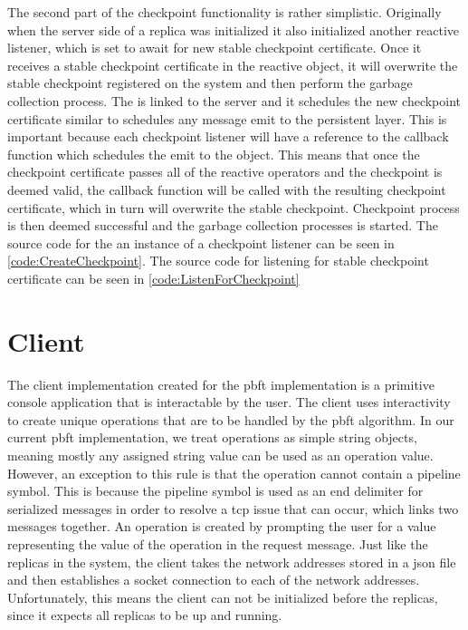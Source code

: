 The second part of the checkpoint functionality is rather simplistic. Originally when the server side of a replica was initialized it also initialized another reactive listener, which is set to await for new stable checkpoint certificate. Once it receives a stable checkpoint certificate in the reactive  object, it will overwrite the stable checkpoint registered on the system and then perform the garbage collection process. The  is linked to the server and it schedules the new checkpoint certificate similar to schedules any message emit to the persistent layer. This is important because each checkpoint listener will have a reference to the callback function which schedules the emit to the  object. This means that once the checkpoint certificate passes all of the reactive operators and the checkpoint is deemed valid, the callback function will be called with the resulting checkpoint certificate, which in turn will overwrite the stable checkpoint. Checkpoint process is then deemed successful and the garbage collection processes is started. The source code for the an instance of a checkpoint listener can be seen in \autoref{code:CreateCheckpoint}. The source code for listening for stable checkpoint certificate can be seen in \autoref{code:ListenForCheckpoint}
\fi

\section{Client}
\iffalse
The client implementation created for the \ac{pbft} implementation is a primitive console application that is interactable by the user. The client uses interactivity to create unique operations that are to be handled by the \ac{pbft} algorithm. In our current \ac{pbft} implementation, we treat operations as simple string objects, meaning mostly any assigned string value can be used as an operation value. However, an exception to this rule is that the operation cannot contain a pipeline symbol. This is because the pipeline symbol is used as an end delimiter for serialized messages in order to resolve a \ac{tcp} issue that can occur, which links two messages together. An operation is created by prompting the user for a value representing the value of the operation in the request message. 
Just like the replicas in the system, the client takes the network addresses stored in a \ac{json} file and then establishes a socket connection to each of the network addresses. Unfortunately, this means the client can not be initialized before the replicas, since it expects all replicas to be up and running.

